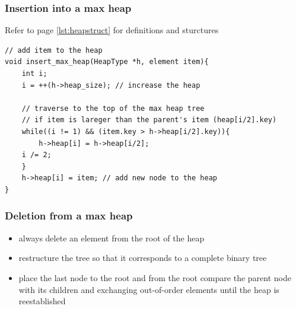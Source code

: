 \documentclass[newPxFont,sthlmFooter,nooffset]{beamer}
\begin{document}
\begin{frame}[t, fragile]
  \frametitle{Insertion into a max heap}

Refer to page \ref{lst:heapstruct} for definitions and sturctures

  \begin{lstlisting}
// add item to the heap
void insert_max_heap(HeapType *h, element item){
    int i;
    i = ++(h->heap_size); // increase the heap

    // traverse to the top of the max heap tree
    // if item is lareger than the parent's item (heap[i/2].key)
    while((i != 1) && (item.key > h->heap[i/2].key)){
        h->heap[i] = h->heap[i/2];
	i /= 2;
    }
    h->heap[i] = item; // add new node to the heap
}
  \end{lstlisting}
\end{frame}


\begin{frame}[t]
  \frametitle{Deletion from a max heap}
  \begin{itemize}
  \item always delete an element from the root of the heap
  \item restructure the tree so that it corresponds to a complete binary tree
  \item place the last node to the root and from the root compare the parent node with its children and exchanging out-of-order elements until the heap is reestablished
  \end{itemize}
\end{frame}
\end{document}
